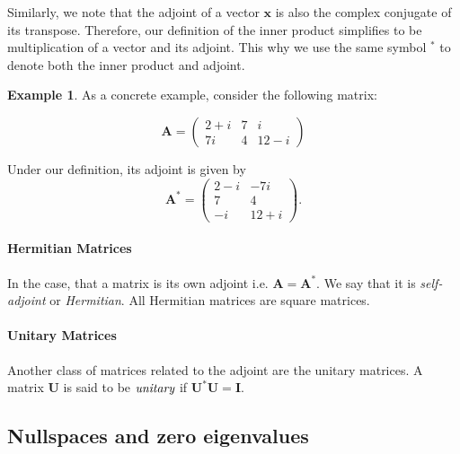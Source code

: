 \documentclass[12pt]{article}
\renewcommand{\vec}[1]{\mathbf{#1}}
\theoremstyle{definition}
\newtheorem{exmp}[thm]{Example}
\theoremstyle{remark}
\numberwithin{equation}{section}
\begin{document}
Similarly, we note that the adjoint of a vector $\vec{x}$ is also the complex conjugate of its transpose. Therefore, our definition of the inner product simplifies to be multiplication of a vector and its adjoint. This why we use the same symbol $^*$ to denote both the inner product and adjoint.
\begin{exmp}
As a concrete example, consider the following matrix:

\begin{equation}
  \vec{A} = \begin{pmatrix}
    2 + i & 7 & i \\
    7i & 4 & 12 - i 
  \end{pmatrix}
\end{equation}

Under our definition, its adjoint is given by
\begin{equation}
  \vec{A}^* = \begin{pmatrix}
    2-i & -7i \\
    7   & 4   \\ 
    -i  & 12 + i
  \end{pmatrix}. 
\end{equation}
\end{exmp}

\paragraph{Hermitian Matrices}%
\label{par:hermitian_matrices}

In the case, that a matrix is its own adjoint i.e. $\vec{A} = \vec{A}^*$. We say that it is \emph{self-adjoint} or \emph{Hermitian}. All Hermitian matrices are square matrices.


\paragraph{Unitary Matrices}%
\label{par:unitary_matrices}
Another class of matrices related to the adjoint are the unitary matrices. A matrix $\vec{U}$ is said to be $\emph{unitary}$ if $\vec{U}^* \vec{U} = \vec{I}$. 


\subsection{Nullspaces and zero eigenvalues}%
\label{sub:nullspaces}
\end{document}
